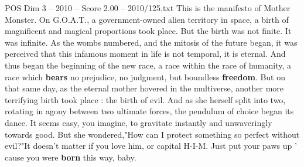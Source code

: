 \begin{textsample}{POS Dim 3 – 2010 – Score 2.00 – 2010/125.txt}  \label{ex:f3_pos_026}
This is the manifesto of Mother Monster.
On G.O.A.T., a government-owned alien territory in space, a birth of magnificent and magical proportions took place.
But the birth was not finite.
It was infinite.
As the wombs numbered, and the mitosis of the future began, it was perceived that this infamous moment in life is not temporal, it is eternal.
And thus began the beginning of the new race, a race within the race of humanity, a race which \textbf{bears} no prejudice, no judgment, but boundless \textbf{freedom}.
But on that same day, as the eternal mother hovered in the multiverse, another more terrifying birth took place : the birth of evil.
And as she herself split into two, rotating in agony between two ultimate forces, the pendulum of choice began its dance.
It seems easy, you imagine, to gravitate instantly and unwaveringly towards good.
But she wondered,"How can I protect something so perfect without evil?"It doesn't matter if you love him, or capital H-I-M.
Just put your paws up ' cause you were \textbf{born} this way, baby.

\end{textsample}
